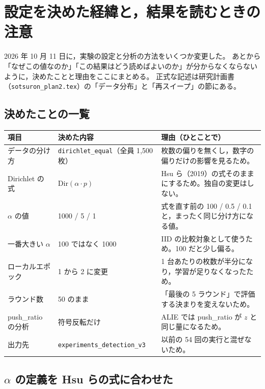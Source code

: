 \documentclass[a4j, dvipdfmx]{jsarticle}  %
\begin{document}
\section{設定を決めた経緯と，結果を読むときの注意}
\label{sec:decisions}

2026 年 10 月 11 日に，実験の設定と分析の方法をいくつか変更した。
あとから「なぜこの値なのか」「この結果はどう読めばよいのか」が分からなくならないように，決めたことと理由をここにまとめる。
正式な記述は研究計画書（\texttt{sotsuron\_plan2.tex}）の「データ分布」と「再スイープ」の節にある。

\subsection{決めたことの一覧}

\begin{table}[H]
\centering
\begin{tabular}{@{}P{3.3cm} P{3.6cm} P{8.4cm}@{}}
\toprule
項目 & 決めた内容 & 理由（ひとことで） \\
\midrule
データの分け方 & \texttt{dirichlet\_equal}（全員 1{,}500 枚） & 枚数の偏りを無くし，数字の偏りだけの影響を見るため。 \\
Dirichlet の式 & $\mathrm{Dir}(\alpha \cdot p)$ & Hsu ら（2019）の式そのままにするため。独自の変更はしない。 \\
$\alpha$ の値 & 1000 / 5 / 1 & 式を直す前の 100 / 0.5 / 0.1 と，まったく同じ分け方になる値。 \\
一番大きい $\alpha$ & 100 ではなく 1000 & IID の比較対象として使うため。100 だと少し偏る。 \\
ローカルエポック & 1 から 2 に変更 & 1 台あたりの枚数が半分になり，学習が足りなくなったため。 \\
ラウンド数 & 50 のまま & 「最後の 5 ラウンド」で評価する決まりを変えないため。 \\
push\_ratio の分析 & 符号反転だけ & ALIE では push\_ratio が $z$ と同じ量になるため。 \\
出力先 & \texttt{experiments\_}\allowbreak\texttt{detection\_v3} & 以前の 54 回の実行と混ぜないため。 \\
\bottomrule
\end{tabular}
\end{table}

\subsection{$\alpha$ の定義を Hsu らの式に合わせた}
\end{document}
